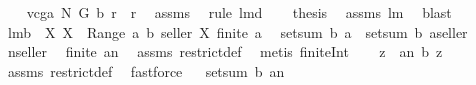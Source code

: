 \begin{isabellebody}
%
\isadelimproof
%
\endisadelimproof
%
\isatagproof
{}\isamarkupfalse%
\ {\isacharminus}\ \isamarkupfalse%
\ {\isachardoublequoteopen}vcga{\isacharprime}\ N\ G\ b\ r\ {\isasymin}\ {\isacharquery}r{\isachardoublequoteclose}\ \isamarkupfalse%
\ assms\ \isamarkupfalse%
\ {\isacharparenleft}rule\ lm{}{}d{\isacharparenright}\ \isamarkupfalse%
\ \isamarkupfalse%
\ {\isacharquery}thesis\ \isamarkupfalse%
\ assms\ lm{}{}{}\ \isamarkupfalse%
\ blast\ \isamarkupfalse%
%
\endisatagproof
{\isafoldproof}%
%
\isadelimproof
\isanewline
%
\endisadelimproof
\isanewline
{}\isamarkupfalse%
\ lm{}{}b{\isacharcolon}\ \ {\isachardoublequoteopen}{\isasymforall}X{\isachardot}\ X\ {\isasymin}\ Range\ a\ {\isasymlongrightarrow}b\ {\isacharparenleft}seller{\isacharcomma}\ X{\isacharparenright}{\isacharequal}{}{\isachardoublequoteclose}\ {\isachardoublequoteopen}finite\ a{\isachardoublequoteclose}\ \ \isanewline
{\isachardoublequoteopen}setsum\ b\ a\ {\isacharequal}\ setsum\ b\ {\isacharparenleft}a{\isacharminus}{\isacharminus}seller{\isacharparenright}{\isachardoublequoteclose}\isanewline
%
\isadelimproof
%
\endisadelimproof
%
\isatagproof
{}\isamarkupfalse%
\ {\isacharminus}\isanewline
{}\isamarkupfalse%
\ {\isacharquery}n{\isacharequal}seller\ \isamarkupfalse%
\ {\isachardoublequoteopen}finite\ {\isacharparenleft}a{\isacharbar}{\isacharbar}{\isacharbraceleft}{\isacharquery}n{\isacharbraceright}{\isacharparenright}{\isachardoublequoteclose}\ \isamarkupfalse%
\ assms\ restrict{\isacharunderscore}def\ \isamarkupfalse%
\ {\isacharparenleft}metis\ finite{\isacharunderscore}Int{\isacharparenright}\ \isanewline
{}\isamarkupfalse%
\ \isamarkupfalse%
\ {\isachardoublequoteopen}{\isasymforall}z\ {\isasymin}\ a{\isacharbar}{\isacharbar}{\isacharbraceleft}{\isacharquery}n{\isacharbraceright}{\isachardot}\ b\ z{\isacharequal}{}{\isachardoublequoteclose}\ \isamarkupfalse%
\ assms\ restrict{\isacharunderscore}def\ \isamarkupfalse%
\ fastforce\isanewline
{}\isamarkupfalse%
\ \isamarkupfalse%
\ {\isachardoublequoteopen}setsum\ b\ {\isacharparenleft}a{\isacharbar}{\isacharbar}{\isacharbraceleft}{\isacharquery}n{\isacharbraceright}{\isacharparenright}\ {\isacharequal}\ {}{\isachardoublequoteclose}\ \isamarkupfalse%

\end{isabellebody}
